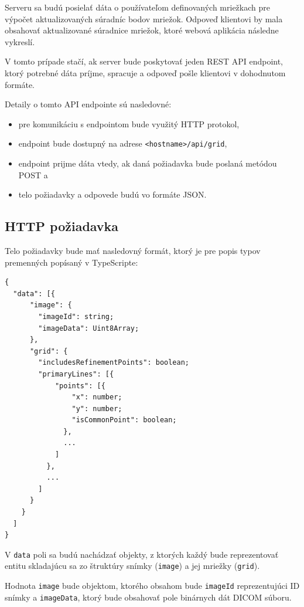 Serveru sa budú posielať dáta o používateľom definovaných mriežkach pre výpočet aktualizovaných súradníc bodov mriežok. Odpoveď klientovi by mala obsahovať aktualizované súradnice mriežok, ktoré webová aplikácia následne vykreslí.

V tomto prípade stačí, ak server bude poskytovať jeden REST API endpoint, ktorý potrebné dáta príjme, spracuje a odpoveď pošle klientovi v dohodnutom formáte.

Detaily o tomto API endpointe sú nasledovné:
\begin {itemize}
\item {pre komunikáciu s endpointom bude využitý HTTP protokol,}
\item {endpoint bude dostupný na adrese \texttt{<hostname>/api/grid},}
\item {endpoint prijme dáta vtedy, ak daná požiadavka bude poslaná metódou POST a}
\item {telo požiadavky a odpovede budú vo formáte JSON.}
\end {itemize}

\subsection {HTTP požiadavka}\label{http_request}

Telo požiadavky bude mať nasledovný formát, ktorý je pre popis typov premenných popísaný v TypeScripte:

\begin{minipage}[]{\linewidth}
\begin{verbatim}
{
  "data": [{
      "image": {
        "imageId": string;
        "imageData": Uint8Array;
      },
      "grid": {
        "includesRefinementPoints": boolean;
        "primaryLines": [{
            "points": [{
                "x": number;
                "y": number;
                "isCommonPoint": boolean;
              },
              ...
            ]
          },
          ...
        ]
      }
    }
  ]
}
\end{verbatim}
\end{minipage}

V \texttt{data} poli sa budú nachádzať objekty, z ktorých každý bude reprezentovať entitu skladajúcu sa zo štruktúry snímky (\texttt{image}) a jej mriežky (\texttt{grid}).

Hodnota \texttt{image} bude objektom, ktorého obsahom bude \texttt{imageId} reprezentujúci ID snímky a \texttt{imageData}, ktorý bude obsahovať pole binárnych dát DICOM súboru.

